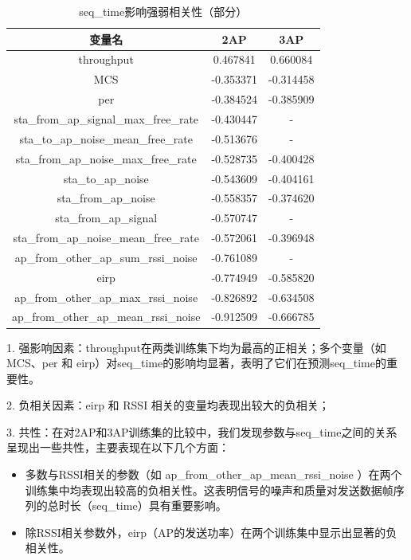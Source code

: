 \begin{longtable}{ccc}
	\caption{seq\_time影响强弱相关性（部分）}\\
	\hline
	\textbf{变量名} & \textbf{2AP} & \textbf{3AP} \\ 
	\hline
	throughput                          & 0.467841      & 0.660084      \\
	MCS                                & -0.353371     & -0.314458     \\
	per                                & -0.384524     & -0.385909     \\
	sta\_from\_ap\_signal\_max\_free\_rate & -0.430447     & -            \\
	sta\_to\_ap\_noise\_mean\_free\_rate & -0.513676     & -            \\
	sta\_from\_ap\_noise\_max\_free\_rate  & -0.528735     & -0.400428     \\
	sta\_to\_ap\_noise                    & -0.543609     & -0.404161     \\
	sta\_from\_ap\_noise                  & -0.558357     & -0.374620     \\
	sta\_from\_ap\_signal                 & -0.570747     & -            \\
	sta\_from\_ap\_noise\_mean\_free\_rate & -0.572061     & -0.396948     \\
	ap\_from\_other\_ap\_sum\_rssi\_noise & -0.761089     & -            \\
	eirp                               & -0.774949     & -0.585820     \\
	ap\_from\_other\_ap\_max\_rssi\_noise & -0.826892     & -0.634508     \\
	ap\_from\_other\_ap\_mean\_rssi\_noise & -0.912509     & -0.666785     \\ 
	\hline
\end{longtable}

1. 强影响因素：throughput在两类训练集下均为最高的正相关；多个变量（如 MCS、per 和 eirp）对seq\_time的影响均显著，表明了它们在预测seq\_time的重要性。

2. 负相关因素：eirp 和 RSSI 相关的变量均表现出较大的负相关；

3. 共性：在对2AP和3AP训练集的比较中，我们发现参数与seq\_time之间的关系呈现出一些共性，主要表现在以下几个方面：

\begin{itemize}
	\item 多数与RSSI相关的参数（如 ap\_from\_other\_ap\_mean\_rssi\_noise ）在两个训练集中均表现出较高的负相关性。这表明信号的噪声和质量对发送数据帧序列的总时长（seq\_time）具有重要影响。
	\item 除RSSI相关参数外，eirp（AP的发送功率）在两个训练集中显示出显著的负相关性。
\end{itemize}


